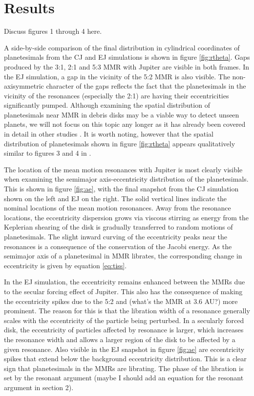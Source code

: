 \documentclass[twocolumn]{aastex63}
\begin{document}
\section{Results} \label{sec:results}

Discuss figures 1 through 4 here.

A side-by-side comparison of the final distribution in cylindrical coordinates of planetesimals from the CJ and EJ simulations is shown 
in figure \ref{fig:rtheta}. Gaps produced by the 3:1, 2:1 and 5:3 MMR with Jupiter are visible in both frames. In the EJ simulation, a 
gap in the vicinity of the 5:2 MMR is also visible. The non-axisymmetric character of the gaps reflects the fact that the planetesimals 
in the vicinity of the resonances (especially the 2:1) are having their eccentricities significantly pumped. Although examining the spatial distribution of planetesimals near MMR in debris disks may be a viable way to detect  unseen planets, we will not focus on this topic any longer as it has already been covered in detail in other studies \citep{2016ApJ...818..159T, 2018ApJ...857....3T}. It is worth noting, however that the spatial distribution of planetesimals shown in  figure \ref{fig:rtheta} appears qualitatively similar to figures 3 and 4 in \citep{2016ApJ...818..159T}.

The location of the mean motion resonances with Jupiter is most clearly visible when examining the semimajor axis-eccentricity 
distribution of the planetesimals. This is shown in figure \ref{fig:ae}, with the final snapshot from the CJ simulation shown on the left 
and EJ on the right. The solid vertical lines indicate the nominal locations of the mean motion resonances. Away from the resonance 
locations, the eccentricity dispersion grows via viscous stirring as energy from the Keplerian shearing of the disk is gradually 
transferred to random motions of planetesimals. The slight inward curving of the eccentricity peaks near the resonances is a 
consequence of the conservation of the Jacobi energy. As the semimajor axis of a planetesimal in MMR librates, the corresponding 
change in eccentricity is given by equation \ref{eq:tiss}.

In the EJ simulation, the eccentricity remains enhanced between the MMRs due to the secular forcing effect of Jupiter. This also has 
the consequence of making the eccentricity spikes due to the 5:2 and (what's the MMR at 3.6 AU?) more prominent. The reason for 
this is that the libration width of a resonance generally scales with the eccentricity of the particle being perturbed. In a secularly 
forced disk, the eccentricity of particles affected by resonance is larger, which increases the resonance width and allows a larger 
region of the disk to be affected by a given resonance. Also visible in the EJ snapshot in figure \ref{fig:ae} are eccentricity spikes that 
extend below the background eccentricity distribution. This is a clear sign that planetesimals in the MMRs are librating. The phase of 
the libration is set by the resonant argument (maybe I should add an equation for the resonant argument in section 2).
\end{document}
